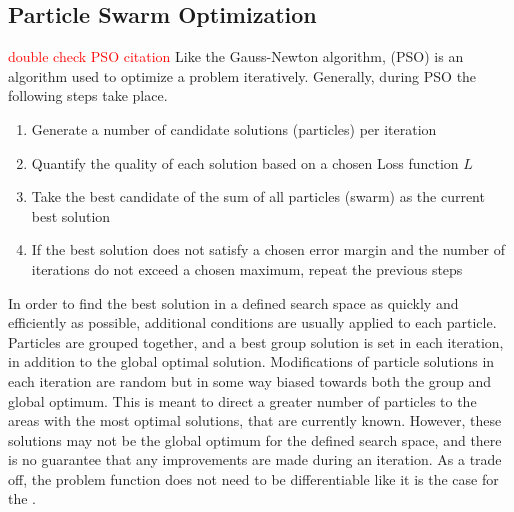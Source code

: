 
\subsection{Particle Swarm Optimization}
\label{sec:PSO}
\textcolor{red}{double check PSO citation}
Like the Gauss-Newton algorithm,  (PSO) is an algorithm used to optimize a problem iteratively\cite{akman2018parameter}.
Generally, during PSO the following steps take place.

\begin{enumerate}
	\item Generate a number of candidate solutions (particles) per iteration
	\item Quantify the quality of each solution based on a chosen Loss function $L$
	\item Take the best candidate of the sum of all particles (swarm) as the current best solution
	\item If the best solution does not satisfy a chosen error margin and the number of iterations do not exceed a chosen
		maximum, repeat the previous steps
\end{enumerate}


In order to find the best solution in a defined search space as quickly and efficiently as possible, additional conditions are usually applied
to each particle. Particles are grouped together, and a best group solution is set in each iteration, in addition to the global optimal solution.
Modifications of particle solutions in each iteration are random but in some way biased towards both the group and global optimum.
This is meant to direct a greater number of particles to the areas with the most optimal solutions, that are currently known.
However, these solutions may not be the global optimum for the defined search space, and there is no guarantee that any improvements are made during
an iteration. As a trade off, the problem function does not need to be differentiable like it is the case for the . \newline

